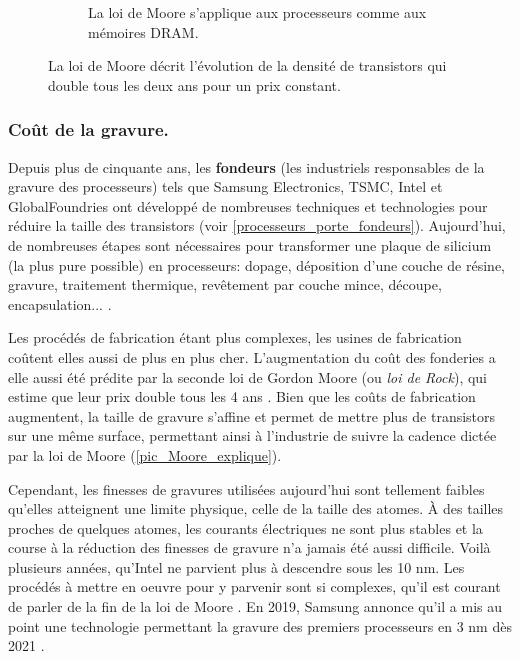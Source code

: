 \begin{figure}
\begin{subfigure}[]{0.48\linewidth}
        \caption{La loi de Moore s'applique aux processeurs comme aux mémoires DRAM.}
        \label{processeurs_porte_moore_dram}
    \end{subfigure}
    \caption{La loi de Moore décrit l'évolution de la densité de transistors qui double tous les deux ans pour un prix constant.}
    \label{fig_processeurs_moore}
\end{figure}





\subsubsection{Coût de la gravure.}

Depuis plus de cinquante ans, les \textbf{fondeurs} (les industriels responsables de la gravure des processeurs) tels que Samsung Electronics, TSMC, Intel et GlobalFoundries ont développé de nombreuses techniques et technologies pour réduire la taille des transistors (voir \autoref{processeurs_porte_fondeurs}). Aujourd'hui, de nombreuses étapes sont nécessaires pour transformer une plaque de silicium (la plus pure possible) en processeurs: dopage, déposition d'une couche de résine, gravure, traitement thermique, revêtement par couche mince, découpe, encapsulation... \cite{AnthonyNelzinSantos2018}.

Les procédés de fabrication étant plus complexes, les usines de fabrication coûtent elles aussi de plus en plus cher. L'augmentation du coût des fonderies a elle aussi été prédite par la seconde loi de Gordon Moore (ou \textit{loi de Rock}), qui estime que leur prix double tous les 4 ans \cite{schaller1997moore}. Bien que les coûts de fabrication augmentent, la taille de gravure s’affine et permet de mettre plus de transistors sur une même surface, permettant ainsi à l’industrie de suivre la cadence dictée par la loi de Moore (\autoref{pic_Moore_explique}).

Cependant, les finesses de gravures utilisées aujourd'hui sont tellement faibles qu'elles atteignent une limite physique, celle de la taille des atomes. À des tailles proches de quelques atomes, les courants électriques ne sont plus stables et la course à la réduction des finesses de gravure n'a jamais été aussi difficile. Voilà plusieurs années, qu'Intel ne parvient plus à descendre sous les 10 nm. Les procédés à mettre en oeuvre pour y parvenir sont si complexes, qu'il est courant de parler de la fin de la loi de Moore \cite{theis2017end}. En 2019, Samsung annonce qu'il a mis au point une technologie permettant la gravure des premiers processeurs en 3 nm dès 2021 \cite{AdrianBRANCO2019}. 


